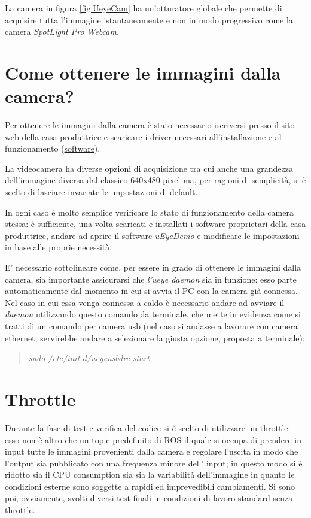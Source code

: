 La camera in figura \ref{fig:UeyeCam} ha un'otturatore globale che permette di acquisire tutta l'immagine istantaneamente e non in modo progressivo come la camera  \textit{SpotLight Pro Webcam}.

\section{Come ottenere le immagini dalla camera?}
Per ottenere le immagini dalla camera è stato necessario iscriversi presso il sito web della casa produttrice e scaricare i driver necessari all'installazione e al funzionamento (\href{https://en.ids-imaging.com/manuals-ueye-software.html}{software}).

La videocamera ha diverse opzioni di acquisizione tra cui anche una grandezza dell'immagine diversa dal classico 640x480 pixel ma, per ragioni di semplicità, si è scelto di lasciare invariate le impostazioni di default.

In ogni caso è molto semplice verificare lo stato di funzionamento della camera stessa: è sufficiente, una volta scaricati e installati i software proprietari della casa produttrice, andare ad aprire il software \textit{uEyeDemo} e modificare le impostazioni in base alle proprie necessità.

E' necessario sottolineare come, per essere in grado di ottenere le immagini dalla camera, sia importante assicurarsi che \textit{l'ueye daemon} sia in funzione: esso parte automaticamente dal momento in cui si avvia il PC con la camera già connessa. Nel caso in cui essa venga connessa a caldo è necessario andare ad avviare il \textit{daemon} utilizzando questo comando da terminale, che mette in evidenza come si tratti di un comando per camera usb (nel caso si andasse a lavorare con camera ethernet, servirebbe andare a selezionare la giusta opzione, proposta a terminale):

\begin{quotation}
	\textsl{sudo /etc/init.d/ueyeusbdrc start}
\end{quotation}
\section{Throttle}
Durante la fase di test e verifica del codice si è scelto di utilizzare un throttle:
esso non è altro che un topic predefinito di ROS il quale si occupa di prendere in input tutte le immagini provenienti dalla camera e regolare l'uscita in modo che l'output sia pubblicato con una frequenza minore dell' input; in questo modo si è ridotto sia il CPU consumption sia sia la variabilità dell'immagine in quanto le condizioni esterne sono soggette a rapidi ed imprevedibili cambiamenti.
Si sono poi, ovviamente, svolti diversi test finali in condizioni di lavoro standard senza throttle.
